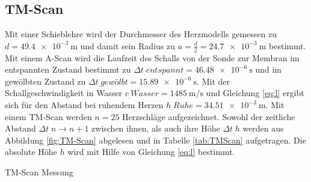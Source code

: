 \subsection{TM-Scan}
Mit einer Schieblehre wird der Durchmesser des Herzmodells gemessen zu $d=\SI{49,4e-3}{\metre}$ und damit sein Radius zu $a=\frac{d}{2}=\SI{24,7e-3}{\metre}$ bestimmt.
Mit einem A-Scan wird die Laufzeit des Schalls von der Sonde zur Membran im entspannten Zustand bestimmt zu $\Delta t_.{entspannt}= \SI{46,48e-6}{\second}$ und im gewölbten Zustand zu $\Delta t_.{gewölbt}= \SI{15,89e-6}{\second}$.\newline
Mit der Schallgeschwindigkeit in Wasser $c_.{Wasser}=\SI{1485}{\metre\per\second}$ und Gleichung \eqref{eq:l} ergibt sich für den Abstand bei ruhendem Herzen $h_.{Ruhe} = \SI{34,51e-3}{\metre}$.
Mit einem TM-Scan werden $n=25$ Herzschläge aufgezeichnet. Sowohl der zeitliche Abstand $\Delta t_.{n\rightarrow n+1}$ zwischen ihnen, als auch ihre Höhe $\Delta t_.h$ werden aus Abbildung \ref{fig:TM-Scan} abgelesen und in Tabelle \ref{tab:TMScan} aufgetragen.\newline
Die absolute Höhe $h$ wird mit Hilfe von Gleichung \ref{eq:l} bestimmt.\newline
\begin{table}
	\centering
	\caption{TM-Scan Messung}
	
	\label{tab:TMScan}
\end{table}

